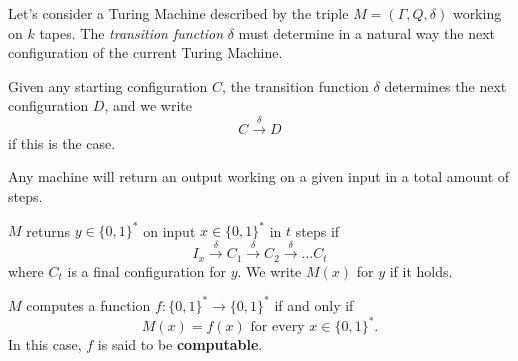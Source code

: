 Let's consider a Turing Machine described by the triple $M = (\Gamma,Q,\delta)$ working on $k$ tapes. The \textit{transition function} $\delta$
must determine in a natural way the next configuration of the current Turing Machine.
\begin{definition}
    Given any starting configuration $C$, the transition function $\delta$ determines the next configuration $D$, and we write
    $$ C \xrightarrow{\delta} D$$
    if this is the case.
\end{definition}
Any machine will return an output working on a given input in a total amount of steps.
\begin{definition}
    $M$ returns $y \in \{0,1\}^*$ on input $x \in \{0,1\}^*$ in $t$ steps if 
    $$ I_x \xrightarrow{\delta} C_1 \xrightarrow{\delta} C_2 \xrightarrow{\delta} \dots C_t $$
    where $C_t$ is a final configuration for $y$. We write $M(x)$ for $y$ if it holds.
\end{definition}
\begin{definition}
    $M$ computes a function $f: \{0,1\}^* \rightarrow \{0,1\}^*$ if and only if 
    $$M(x) = f(x) \text{ for every } x \in \{0,1\}^*.$$ 
    In this case, $f$ is said to be \textbf{computable}.
\end{definition}